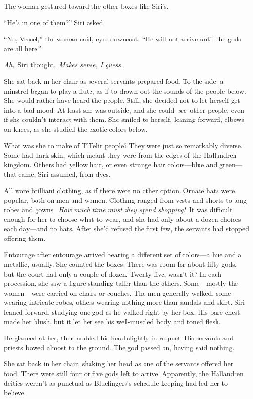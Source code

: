The woman gestured toward the other boxes like Siri’s.

“He’s in one of them?” Siri asked.

“No, Vessel,” the woman said, eyes downcast. “He will not arrive until the gods are all here.”

\textit{Ah,}~Siri thought.~\textit{Makes sense, I guess.}

She sat back in her chair as several servants prepared food. To the side, a minstrel began to play a flute, as if to drown out the sounds of the people below. She would rather have heard the people. Still, she decided not to let herself get into a bad mood. At least she was outside, and she could~\textit{see}~other people, even if she couldn’t interact with them. She smiled to herself, leaning forward, elbows on knees, as she studied the exotic colors below.

What was she to make of T’Telir people? They were just so remarkably diverse. Some had dark skin, which meant they were from the edges of the Hallandren kingdom. Others had yellow hair, or even strange hair colors—blue and green—that came, Siri assumed, from dyes.

All wore brilliant clothing, as if there were no other option. Ornate hats were popular, both on men and women. Clothing ranged from vests and shorts to long robes and gowns.~\textit{How much time must they spend shopping!}~It was difficult enough for her to choose what to wear, and she had only about a dozen choices each day—and no hats. After she’d refused the first few, the servants had stopped offering them.

Entourage after entourage arrived bearing a different set of colors—a hue and a metallic, usually. She counted the boxes. There was room for about fifty gods, but the court had only a couple of dozen. Twenty-five, wasn’t it? In each procession, she saw a figure standing taller than the others. Some—mostly the women—were carried on chairs or couches. The men generally walked, some wearing intricate robes, others wearing nothing more than sandals and skirt. Siri leaned forward, studying one god as he walked right by her box. His bare chest made her blush, but it let her see his well-muscled body and toned flesh.

He glanced at her, then nodded his head slightly in respect. His servants and priests bowed almost to the ground. The god passed on, having said nothing.

She sat back in her chair, shaking her head as one of the servants offered her food. There were still four or five gods left to arrive. Apparently, the Hallandren deities weren’t as punctual as Bluefingers’s schedule-keeping had led her to believe.

